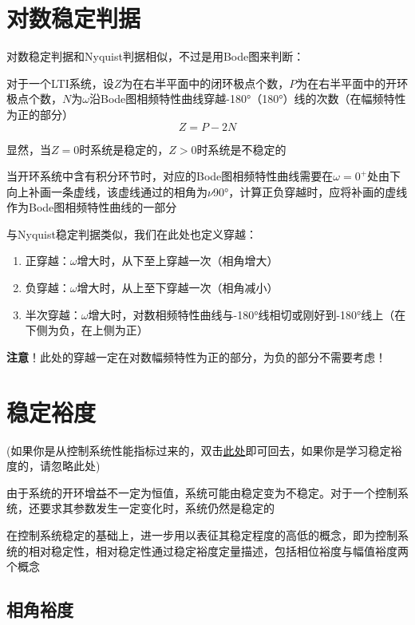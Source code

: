 \section{对数稳定判据}
对数稳定判据和Nyquist判据相似，不过是用Bode图来判断：
\begin{definition}
    对于一个LTI系统，设$Z$为在右半平面中的闭环极点个数，$P$为在右半平面中的开环极点个数，$N$为$\omega$沿Bode图相频特性曲线穿越-180°（180°）线的次数（在幅频特性为正的部分）
    \begin{equation*}
        Z = P - 2N
    \end{equation*}

    显然，当$Z=0$时系统是稳定的，$Z>0$时系统是不稳定的

    当开环系统中含有积分环节时，对应的Bode图相频特性曲线需要在$\omega = 0^+$处由下向上补画一条虚线，该虚线通过的相角为$\nu$90°，计算正负穿越时，应将补画的虚线作为Bode图相频特性曲线的一部分

    与Nyquist稳定判据类似，我们在此处也定义穿越：
    \begin{enumerate}
        \item 正穿越：$\omega$增大时，从下至上穿越一次（相角增大）
        \item 负穿越：$\omega$增大时，从上至下穿越一次（相角减小）
        \item 半次穿越：$\omega$增大时，对数相频特性曲线与-180°线相切或刚好到-180°线上（在下侧为负，在上侧为正）
    \end{enumerate}

    \textbf{注意}！此处的穿越一定在对数幅频特性为正的部分，为负的部分不需要考虑！
\end{definition}

\section{稳定裕度}
\label{sec:stability-margin}
(如果你是从控制系统性能指标过来的，双击\hyperref[chap:performance-metrics]{此处}即可回去，如果你是学习稳定裕度的，请忽略此处)

由于系统的开环增益不一定为恒值，系统可能由稳定变为不稳定。对于一个控制系统，还要求其参数发生一定变化时，系统仍然是稳定的

在控制系统稳定的基础上，进一步用以表征其稳定程度的高低的概念，即为控制系统的相对稳定性，相对稳定性通过稳定裕度定量描述，包括相位裕度与幅值裕度两个概念

\subsection{相角裕度}

